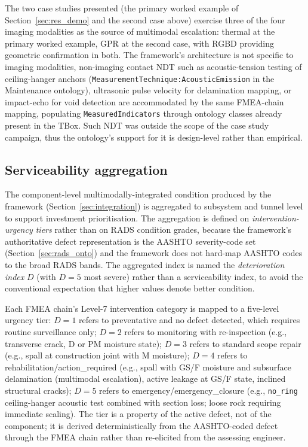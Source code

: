 \documentclass[11pt,a4paper]{article}
\begin{document}
The two case studies presented (the primary worked example of Section~\ref{sec:res_demo} and the second case above) exercise three of the four imaging modalities as the source of multimodal escalation: thermal at the primary worked example, GPR at the second case, with RGBD providing geometric confirmation in both. The framework's architecture is not specific to imaging modalities, non-imaging contact NDT such as acoustic-tension testing of ceiling-hanger anchors (\texttt{MeasurementTechnique:AcousticEmission} in the Maintenance ontology), ultrasonic pulse velocity for delamination mapping, or impact-echo for void detection are accommodated by the same FMEA-chain mapping, populating \texttt{MeasuredIndicators} through ontology classes already present in the TBox. Such NDT was outside the scope of the case study campaign, thus the ontology's support for it is design-level rather than empirical.

\subsection{Serviceability aggregation}
\label{sec:serviceability}

The component-level multimodally-integrated condition produced by the framework (Section~\ref{sec:integration}) is aggregated to subsystem and tunnel level to support investment prioritisation. The aggregation is defined on \emph{intervention-urgency tiers} rather than on RADS condition grades, because the framework's authoritative defect representation is the AASHTO severity-code set (Section~\ref{sec:rads_onto}) and the framework does not hard-map AASHTO codes to the broad RADS bands. The aggregated index is named the \emph{deterioration index} $D$ (with $D=5$ most severe) rather than a serviceability index, to avoid the conventional expectation that higher values denote better condition.

Each FMEA chain's Level-7 intervention category is mapped to a five-level urgency tier: $D=1$ refers to preventative and no defect detected, which requires routine surveillance only; $D=2$ refers to monitoring with re-inspection (e.g., transverse crack, D or PM moisture state); $D=3$ refers to standard scope repair (e.g., spall at construction joint with M moisture); $D=4$ refers to rehabilitation/action\_required (e.g., spall with GS/F moisture and subsurface delamination (multimodal escalation), active leakage at GS/F state, inclined structural cracks); $D=5$ refers to emergency/emergency\_closure (e.g., \texttt{no\_ring} ceiling-hanger acoustic test combined with section loss; loose rock requiring immediate scaling). The tier is a property of the active defect, not of the component; it is derived deterministically from the AASHTO-coded defect through the FMEA chain rather than re-elicited from the assessing engineer.
\end{document}
